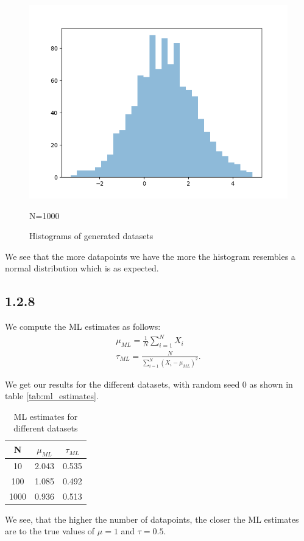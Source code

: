 \documentclass{article}
\begin{document}
\begin{multicols}{2}
\begin{figure}[H]
\begin{minipage}{0.49\textwidth}
            \includegraphics[width=\textwidth]{figures/1.2/dataset_3.png}
            \caption{N=1000}
        \end{minipage}
        \caption{Histograms of generated datasets}\label{fig:histograms_datasets}
    \end{figure}

    We see that the more datapoints we have the more the histogram resembles a normal distribution which is as expected.

    \subsection*{1.2.8}
    We compute the ML estimates as follows:
    \begin{align*}
        \mu_{ML} = \frac{1}{N} \sum_{i=1}^{N} X_i\\
        \tau_{ML} = \frac{N}{\sum_{i=1}^{N} {(X_i - \mu_{ML})}^2}.
    \end{align*}

    We get our results for the different datasets, with random seed $0$ as shown in table \autoref{tab:ml_estimates}.
    \begin{table}[H]
        \centering
        \begin{tabular}{|c|c|c|}     \hline
            N & $\mu_{ML}$ & $\tau_{ML}$ \\
            \hline
            10      &   2.043   &   0.535\\
            100     &   1.085   &   0.492\\
            1000    &   0.936   &   0.513\\
            \hline
        \end{tabular}
        \caption{ML estimates for different datasets}
        \label{tab:ml_estimates}
    \end{table}
    We see, that the higher the number of datapoints, the closer the ML estimates are to the true values of $\mu = 1$ and $\tau = 0.5$.



\end{multicols}
\end{document}
